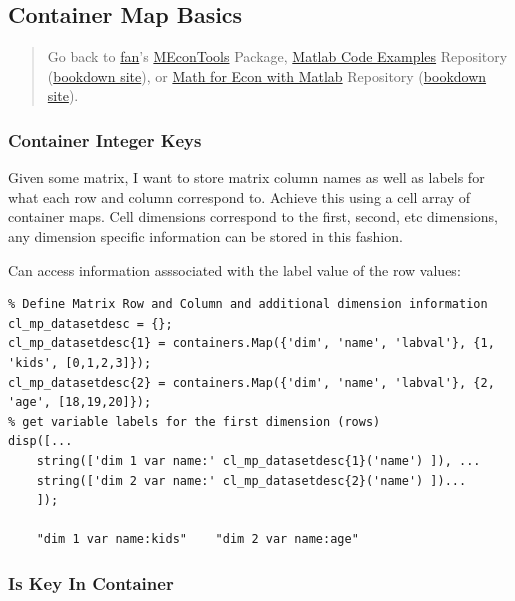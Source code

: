 \documentclass[
]{book}
\begin{document}
\hypertarget{container-map-basics}{%
\subsection{Container Map Basics}\label{container-map-basics}}

\begin{quote}
Go back to \href{http://fanwangecon.github.io/}{fan}'s \href{https://fanwangecon.github.io/MEconTools/}{MEconTools} Package, \href{https://fanwangecon.github.io/M4Econ/}{Matlab Code Examples} Repository (\href{https://fanwangecon.github.io/M4Econ/bookdown}{bookdown site}), or \href{https://fanwangecon.github.io/Math4Econ/}{Math for Econ with Matlab} Repository (\href{https://fanwangecon.github.io/Math4Econ/bookdown}{bookdown site}).
\end{quote}

\hypertarget{container-integer-keys}{%
\subsubsection{Container Integer Keys}\label{container-integer-keys}}

Given some matrix, I want to store matrix column names as well as labels
for what each row and column correspond to. Achieve this using a cell
array of container maps. Cell dimensions correspond to the first,
second, etc dimensions, any dimension specific information can be stored
in this fashion.

Can access information asssociated with the label value of the row
values:

\begin{verbatim}
% Define Matrix Row and Column and additional dimension information
cl_mp_datasetdesc = {};
cl_mp_datasetdesc{1} = containers.Map({'dim', 'name', 'labval'}, {1, 'kids', [0,1,2,3]});
cl_mp_datasetdesc{2} = containers.Map({'dim', 'name', 'labval'}, {2, 'age', [18,19,20]});
% get variable labels for the first dimension (rows)
disp([...
    string(['dim 1 var name:' cl_mp_datasetdesc{1}('name') ]), ...
    string(['dim 2 var name:' cl_mp_datasetdesc{2}('name') ])...
    ]);

    "dim 1 var name:kids"    "dim 2 var name:age"
\end{verbatim}

\hypertarget{is-key-in-container}{%
\subsubsection{Is Key In Container}\label{is-key-in-container}}
\end{document}
